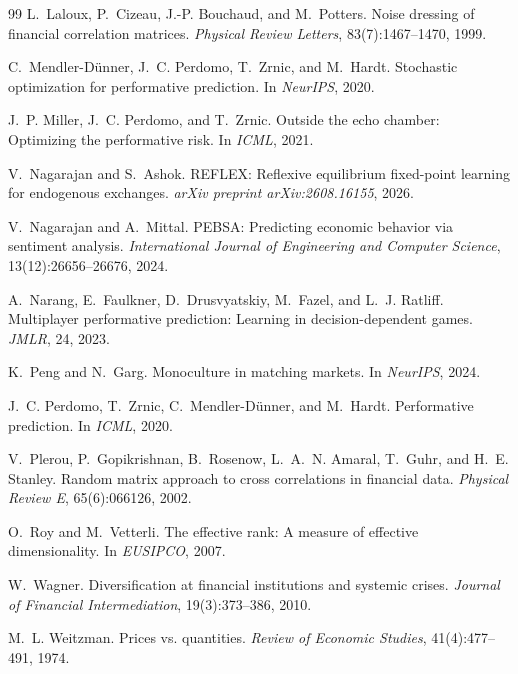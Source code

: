\documentclass{article}
\theoremstyle{plain}
\theoremstyle{definition}
\begin{document}
\begin{thebibliography}{99}
 L.~Laloux, P.~Cizeau, J.-P. Bouchaud, and M.~Potters. Noise dressing of financial correlation matrices. \emph{Physical Review Letters}, 83(7):1467--1470, 1999.

 C.~Mendler-D\"unner, J.~C. Perdomo, T.~Zrnic, and M.~Hardt. Stochastic optimization for performative prediction. In \emph{NeurIPS}, 2020.

 J.~P. Miller, J.~C. Perdomo, and T.~Zrnic. Outside the echo chamber: Optimizing the performative risk. In \emph{ICML}, 2021.

 V.~Nagarajan and S.~Ashok. REFLEX: Reflexive equilibrium fixed-point learning for endogenous exchanges. \emph{arXiv preprint arXiv:2608.16155}, 2026.

 V.~Nagarajan and A.~Mittal. PEBSA: Predicting economic behavior via sentiment analysis. \emph{International Journal of Engineering and Computer Science}, 13(12):26656--26676, 2024.

 A.~Narang, E.~Faulkner, D.~Drusvyatskiy, M.~Fazel, and L.~J. Ratliff. Multiplayer performative prediction: Learning in decision-dependent games. \emph{JMLR}, 24, 2023.

 K.~Peng and N.~Garg. Monoculture in matching markets. In \emph{NeurIPS}, 2024.

 J.~C. Perdomo, T.~Zrnic, C.~Mendler-D\"unner, and M.~Hardt. Performative prediction. In \emph{ICML}, 2020.

 V.~Plerou, P.~Gopikrishnan, B.~Rosenow, L.~A.~N. Amaral, T.~Guhr, and H.~E. Stanley. Random matrix approach to cross correlations in financial data. \emph{Physical Review E}, 65(6):066126, 2002.

 O.~Roy and M.~Vetterli. The effective rank: A measure of effective dimensionality. In \emph{EUSIPCO}, 2007.

 W.~Wagner. Diversification at financial institutions and systemic crises. \emph{Journal of Financial Intermediation}, 19(3):373--386, 2010.

 M.~L. Weitzman. Prices vs. quantities. \emph{Review of Economic Studies}, 41(4):477--491, 1974.

\end{thebibliography}

\appendix



\newpage

\end{document}
